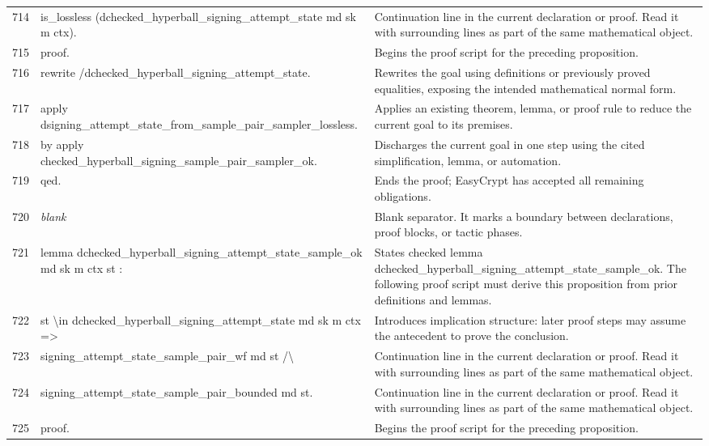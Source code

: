 \documentclass[10pt]{article}
\begin{document}
\begin{longtable}{r L{0.53\textwidth} L{0.37\textwidth}}
714 & {\ttfamily\scriptsize   is\_lossless (dchecked\_hyperball\_signing\_attempt\_state md sk m ctx).} & Continuation line in the current declaration or proof.  Read it with surrounding lines as part of the same mathematical object. \\
715 & {\ttfamily\scriptsize proof.} & Begins the proof script for the preceding proposition. \\
716 & {\ttfamily\scriptsize rewrite /dchecked\_hyperball\_signing\_attempt\_state.} & Rewrites the goal using definitions or previously proved equalities, exposing the intended mathematical normal form. \\
717 & {\ttfamily\scriptsize apply dsigning\_attempt\_state\_from\_sample\_pair\_sampler\_lossless.} & Applies an existing theorem, lemma, or proof rule to reduce the current goal to its premises. \\
718 & {\ttfamily\scriptsize by apply checked\_hyperball\_signing\_sample\_pair\_sampler\_ok.} & Discharges the current goal in one step using the cited simplification, lemma, or automation. \\
719 & {\ttfamily\scriptsize qed.} & Ends the proof; EasyCrypt has accepted all remaining obligations. \\
720 & {\ttfamily\scriptsize \emph{blank}} & Blank separator.  It marks a boundary between declarations, proof blocks, or tactic phases. \\
721 & {\ttfamily\scriptsize lemma dchecked\_hyperball\_signing\_attempt\_state\_sample\_ok md sk m ctx st :} & States checked lemma dchecked\_hyperball\_signing\_attempt\_state\_sample\_ok.  The following proof script must derive this proposition from prior definitions and lemmas. \\
722 & {\ttfamily\scriptsize   st \textbackslash{}in dchecked\_hyperball\_signing\_attempt\_state md sk m ctx =>} & Introduces implication structure: later proof steps may assume the antecedent to prove the conclusion. \\
723 & {\ttfamily\scriptsize   signing\_attempt\_state\_sample\_pair\_wf md st /\textbackslash{}} & Continuation line in the current declaration or proof.  Read it with surrounding lines as part of the same mathematical object. \\
724 & {\ttfamily\scriptsize   signing\_attempt\_state\_sample\_pair\_bounded md st.} & Continuation line in the current declaration or proof.  Read it with surrounding lines as part of the same mathematical object. \\
725 & {\ttfamily\scriptsize proof.} & Begins the proof script for the preceding proposition. \\

\end{longtable}
\end{document}

